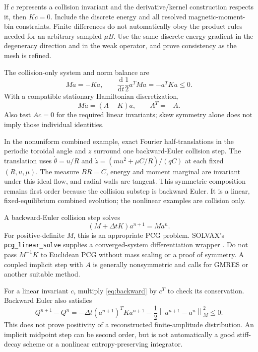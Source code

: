 \documentclass[11pt,letterpaper]{article}
\newcommand{\dd}{\mathrm d}
\newcommand{\norm}[1]{\left\lVert #1\right\rVert}
\begin{document}
If $c$ represents a collision invariant and the derivative/kernel construction
respects it, then $Kc=0$. Include the discrete energy and all resolved
magnetic-moment-bin constraints. Finite differences do not automatically obey
the product rules needed for an arbitrary sampled $\mu B$. Use the same discrete
energy gradient in the degeneracy direction and in the weak operator, and prove
consistency as the mesh is refined.

The collision-only system and norm balance are
\begin{equation}
 M\dot a=-Ka,\qquad
 \frac{\dd}{\dd t}\frac12a^TMa=-a^TKa\le0.
 \label{eq:semidiscrete}
\end{equation}
With a compatible stationary Hamiltonian discretization,
\begin{equation}
 M\dot a=(A-K)a,\qquad A^T=-A.
 \label{eq:combined}
\end{equation}
Also test $Ac=0$ for the required linear invariants; skew symmetry alone does not
imply those individual identities.

In the nonuniform combined example, exact Fourier half-translations in the
periodic toroidal angle and $z$ surround one backward-Euler collision step.
The translation uses $\dot\theta=u/R$ and
$\dot z=(m u^2+\mu C/R)/(qC)$ at each fixed $(R,u,\mu)$.
The measure $BR=C$, energy and moment marginal are invariant under this ideal
flow, and radial walls are tangent. This symmetric composition remains first
order because the collision substep is backward Euler. It is a linear,
fixed-equilibrium combined evolution; the nonlinear examples are collision only.

A backward-Euler collision step solves
\begin{equation}
 (M+\Delta tK)a^{n+1}=Ma^n.
 \label{eq:backward}
\end{equation}
For positive-definite $M$, this is an appropriate PCG problem. SOLVAX's
\texttt{pcg\_linear\_solve} supplies a converged-system differentiation wrapper
\cite{SOLVAX}. Do not pass $M^{-1}K$ to Euclidean PCG without mass scaling or a
proof of symmetry. A coupled implicit step with $A$ is generally nonsymmetric
and calls for GMRES or another suitable method.

For a linear invariant $c$, multiply \eqref{eq:backward} by $c^T$ to check its
conservation. Backward Euler also satisfies
\begin{equation}
 Q^{n+1}-Q^n=-\Delta t(a^{n+1})^TKa^{n+1}
 -\frac12\norm{a^{n+1}-a^n}_M^2\le0.
\end{equation}
This does not prove positivity of a reconstructed finite-amplitude distribution.
An implicit midpoint step can be second order, but is not automatically a good
stiff-decay scheme or a nonlinear entropy-preserving integrator.
\end{document}
